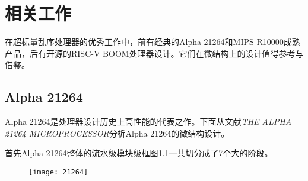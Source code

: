 \chapter{相关工作}\label{sec:meterial}
在超标量乱序处理器的优秀工作中，前有经典的Alpha 21264和MIPS R10000成熟产品，后有开源的RISC-V BOOM处理器设计。它们在微结构上的设计值得参考与借鉴。
\section{Alpha 21264}\label{subsec:alpha}

Alpha 21264是处理器设计历史上高性能的代表之作。下面从文献\textit{THE ALPHA 21264 MICROPROCESSOR}\citep{Alpha21264}分析Alpha 21264的微结构设计。

首先Alpha 21264整体的流水级模块级框图\ref{fig:alpha_stage}一共切分成了7个大的阶段。
\begin{figure}[!htbp]
	\centering
	\texttt{[image: 21264]}
	\label{fig:alpha_stage}
\end{figure}

